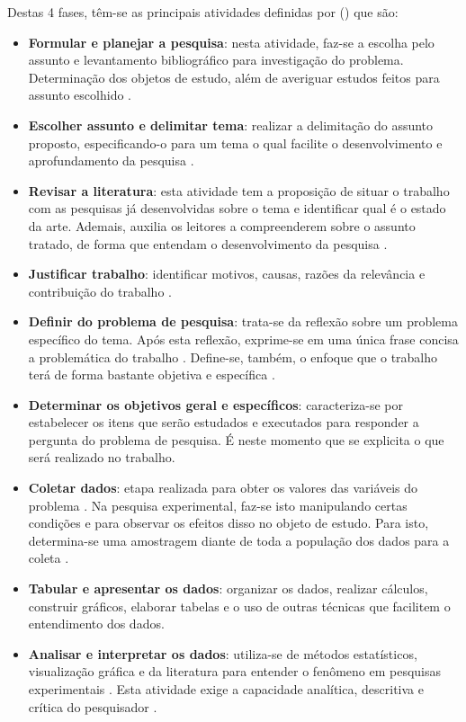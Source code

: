 Destas 4 fases, têm-se as principais atividades definidas por \citeauthor{PRODANOV2013} (\citeyear{PRODANOV2013}) que são:

\begin{itemize}
  \item \textbf{Formular e planejar a pesquisa}: nesta atividade, faz-se a escolha pelo assunto e levantamento bibliográfico para investigação do problema. Determinação dos objetos de estudo, além de averiguar estudos feitos para assunto escolhido \cite{PRODANOV2013}.
  \item \textbf{Escolher assunto e delimitar tema}: realizar a delimitação do assunto proposto, especificando-o para um tema o qual facilite o desenvolvimento e aprofundamento da pesquisa \cite{PRODANOV2013}.
  \item \textbf{Revisar a literatura}: esta atividade tem a proposição de situar o trabalho com as pesquisas já desenvolvidas sobre o tema e identificar qual é o estado da arte. Ademais, auxilia os leitores a compreenderem sobre o assunto tratado, de forma que entendam o desenvolvimento da pesquisa \cite{PRODANOV2013}.
  \item \textbf{Justificar trabalho}: identificar motivos, causas, razões da relevância e contribuição do trabalho \cite{PRODANOV2013}.
  \item \textbf{Definir do problema de pesquisa}: trata-se da reflexão sobre um problema específico do tema. Após esta reflexão, exprime-se em uma única frase concisa a problemática do trabalho \cite{PRODANOV2013}. Define-se, também, o enfoque que o trabalho terá de forma bastante objetiva e específica \cite{GIL2002}.
  \item \textbf{Determinar os objetivos geral e específicos}: caracteriza-se por estabelecer os itens que serão estudados e executados para responder a pergunta do problema de pesquisa. É neste momento que se explicita o que será realizado no trabalho.
  \item \textbf{Coletar dados}: etapa realizada para obter os valores das variáveis do problema \cite{PRODANOV2013}. Na pesquisa experimental, faz-se isto manipulando certas condições e para observar os efeitos disso no objeto de estudo. Para isto, determina-se uma amostragem diante de toda a população dos dados para a coleta \cite{GIL2002}.
  \item \textbf{Tabular e apresentar os dados}: organizar os dados, realizar cálculos, construir gráficos, elaborar tabelas e o uso de outras técnicas que facilitem o entendimento dos dados.
  \item \textbf{Analisar e interpretar os dados}: utiliza-se de métodos estatísticos, visualização gráfica e da literatura para entender o fenômeno em pesquisas experimentais \cite{GIL2002}. Esta atividade exige a capacidade analítica, descritiva e crítica do pesquisador \cite{PRODANOV2013}.   

\end{itemize}

